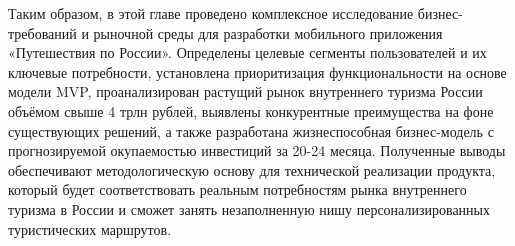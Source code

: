 Таким образом, в этой главе проведено комплексное исследование бизнес-требований и рыночной среды для разработки мобильного приложения «Путешествия по России». Определены целевые сегменты пользователей и их ключевые потребности, установлена приоритизация функциональности на основе модели MVP, проанализирован растущий рынок внутреннего туризма России объёмом свыше 4 трлн рублей, выявлены конкурентные преимущества на фоне существующих решений, а также разработана жизнеспособная бизнес-модель с прогнозируемой окупаемостью инвестиций за 20-24 месяца. Полученные выводы обеспечивают методологическую основу для технической реализации продукта, который будет соответствовать реальным потребностям рынка внутреннего туризма в России и сможет занять незаполненную нишу персонализированных туристических маршрутов.





